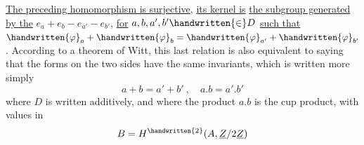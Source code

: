 \uline{The preceding homomorphism is surjective}, \uline{its kernel is}  \uline{the subgroup generated by the} $e_a+e_b-e_{a'}-e_{b'}$, \uline{for} $a,b,a',b'\handwritten{\in}D$ \uline{such that} $\handwritten{\varphi}_a+\handwritten{\varphi}_b=\handwritten{\varphi}_{a'}+\handwritten{\varphi}_{b'}$. According to a theorem of Witt, this last relation is also equivalent to saying that the forms on the two sides have the same invariants, which is written more simply
\reversemarginpar
{}
\normalmarginpar
\[
a+b=a'+b'\ ,\quad a.b=a'.b'
\]
where $D$ is written additively, and where the product $a.b$ is the cup product, with values in
\[
B=H^{\handwritten{2}}(A,\underline{Z}/2\underline{Z})
\]
